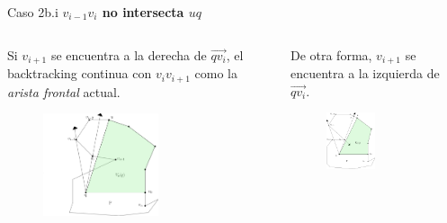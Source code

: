 \documentclass[aspectratio=169,xcolor=dvipsnames, t]{beamer}
\begin{document}
\begin{frame}{Caso 2b.i}
    \textbf{$v_{i-1}v_{i}$ no intersecta $uq$}\\ 
    \begin{columns}
    \begin{column}{0.45\textwidth}
    Si $v_{i+1}$ se encuentra a la derecha de $\overrightarrow{qv_{i}}$, el backtracking continua con $v_{i}v_{i+1}$ como la \textit{arista frontal} actual.
    \begin{figure}
      \hspace{-3cm}
            \centering
            \includegraphics[width=0.6\textwidth]{imagenes/Caso2.5b.png}
        \end{figure}
    \end{column}
    \begin{column}{0.45\textwidth}  %
        De otra forma, $v_{i+1}$ se encuentra a la izquierda de $\overrightarrow{qv_{i}}.$
        \begin{figure}
          \hspace{-2.5cm}
            \centering
            \includegraphics[width=0.5\textwidth]{imagenes/Caso2.6a.png}
        \end{figure}
    \end{column}
    \end{columns}
\end{frame}
\end{document}
